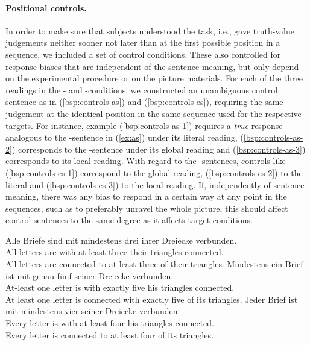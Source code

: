 \documentclass[fleqn,reqno,10pt,draft]{article}
\newcommand{\as}{\acro{as}}
\renewcommand{\es}{\acro{es}}
\begin{document}
\paragraph{Positional controls.} In order to make sure that subjects
understood the task, i.e., gave truth-value judgements neither sooner
not later than at the first possible position in a sequence, we
included a set of control conditions. These also controlled for
response biases that are independent of the sentence meaning, but only
depend on the experimental procedure or on the picture materials. For
each of the three readings in the \as- and \es-conditions, we
constructed an unambiguous control sentence as in
(\ref{bsp:controls-as}) and (\ref{bsp:controls-es}), requiring the
same judgement at the identical position in the same sequence used for
the respective targets. For instance, example
(\ref{bsp:controls-as-1}) requires a \emph{true}-response analogous to
the \as-sentence in (\ref{ex:as}) under its literal reading,
(\ref{bsp:controls-as-2}) corresponds to the \as-sentence under its
global reading and (\ref{bsp:controls-as-3}) corresponds to its local
reading. With regard to the \es-sentences, controls like
(\ref{bsp:controls-es-1}) correspond to the global reading,
(\ref{bsp:controls-es-2}) to the literal and (\ref{bsp:controls-es-3})
to the local reading. If, independently of sentence meaning, there was
any bias to respond in a certain way at any point in the sequences,
such as to preferably unravel the whole picture, this should affect
control sentences to the same degree as it affects target conditions.

\begin{exe}
  \ex \label{bsp:controls-as}
    \begin{xlist}
\ex \label{bsp:controls-as-1} \gll Alle Briefe sind mit mindestens drei ihrer Dreiecke verbunden.\\
  All letters are with at-least three their triangles connected.\\
  \trans All letters are connected to at least three of their triangles.
\ex \label{bsp:controls-as-2} \gll Mindestens ein Brief ist mit genau f\"unf seiner Dreiecke verbunden.\\
  At-least one letter is with exactly five his triangles connected.\\
  \trans At least one letter is connected with exactly five of its triangles.
\ex \label{bsp:controls-as-3} \gll Jeder Brief ist mit mindestens vier seiner Dreiecke verbunden.\\
  Every letter is with at-least four his triangles connected.\\
  \trans Every letter is connected to at least four of its triangles.
\end{xlist}
\end{exe}
\end{document}
